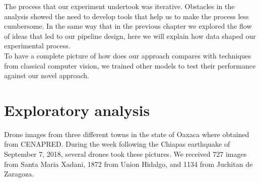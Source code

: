 The process that our experiment undertook was iterative. Obstacles in the analysis showed the need to develop tools that help us to make the process less cumbersome. In the same way that in the previous chapter we explored the flow of ideas that led to our pipeline design, here we will explain how data shaped our experimental process.\\

To have a complete picture of how does our approach compares with techniques from classical computer vision, we trained other models to test their performance against our novel approach.\\

\section{Exploratory analysis}

Drone images from three different towns in the state of Oaxaca where obtained from CENAPRED. During the week following the Chiapas earthquake of September 7, 2018, several drones took these pictures. We received 727 images from Santa Maria Xadani, 1872 from Union Hidalgo, and 1134 from Juchitan de Zaragoza.\\

